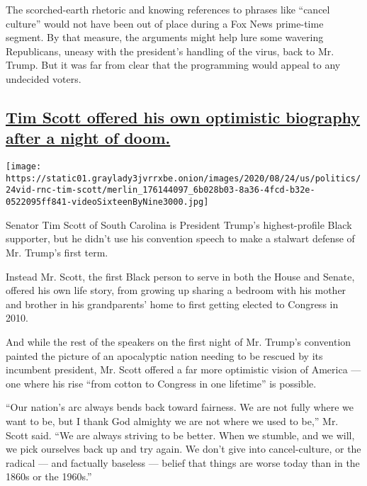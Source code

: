 The scorched-earth rhetoric and knowing references to phrases like
``cancel culture'' would not have been out of place during a Fox News
prime-time segment. By that measure, the arguments might help lure some
wavering Republicans, uneasy with the president's handling of the virus,
back to Mr. Trump. But it was far from clear that the programming would
appeal to any undecided voters.

\hypertarget{tim-scott-offered-his-own-optimistic-biography-after-a-night-of-doom}{%
\subsection{\texorpdfstring{\protect\hyperlink{tim-scott-offered-his-own-optimistic-biography-after-a-night-of-doom}{Tim
Scott offered his own optimistic biography after a night of
doom.}}{Tim Scott offered his own optimistic biography after a night of doom.}}\label{tim-scott-offered-his-own-optimistic-biography-after-a-night-of-doom}}

\texttt{[image: https://static01.graylady3jvrrxbe.onion/images/2020/08/24/us/politics/24vid-rnc-tim-scott/merlin\_176144097\_6b028b03-8a36-4fcd-b32e-0522095ff841-videoSixteenByNine3000.jpg]}

Senator Tim Scott of South Carolina is President Trump's highest-profile
Black supporter, but he didn't use his convention speech to make a
stalwart defense of Mr. Trump's first term.

Instead Mr. Scott, the first Black person to serve in both the House and
Senate, offered his own life story, from growing up sharing a bedroom
with his mother and brother in his grandparents' home to first getting
elected to Congress in 2010.

And while the rest of the speakers on the first night of Mr. Trump's
convention painted the picture of an apocalyptic nation needing to be
rescued by its incumbent president, Mr. Scott offered a far more
optimistic vision of America --- one where his rise ``from cotton to
Congress in one lifetime'' is possible.

``Our nation's arc always bends back toward fairness. We are not fully
where we want to be, but I thank God almighty we are not where we used
to be,'' Mr. Scott said. ``We are always striving to be better. When we
stumble, and we will, we pick ourselves back up and try again. We don't
give into cancel-culture, or the radical --- and factually baseless ---
belief that things are worse today than in the 1860s or the 1960s.''

